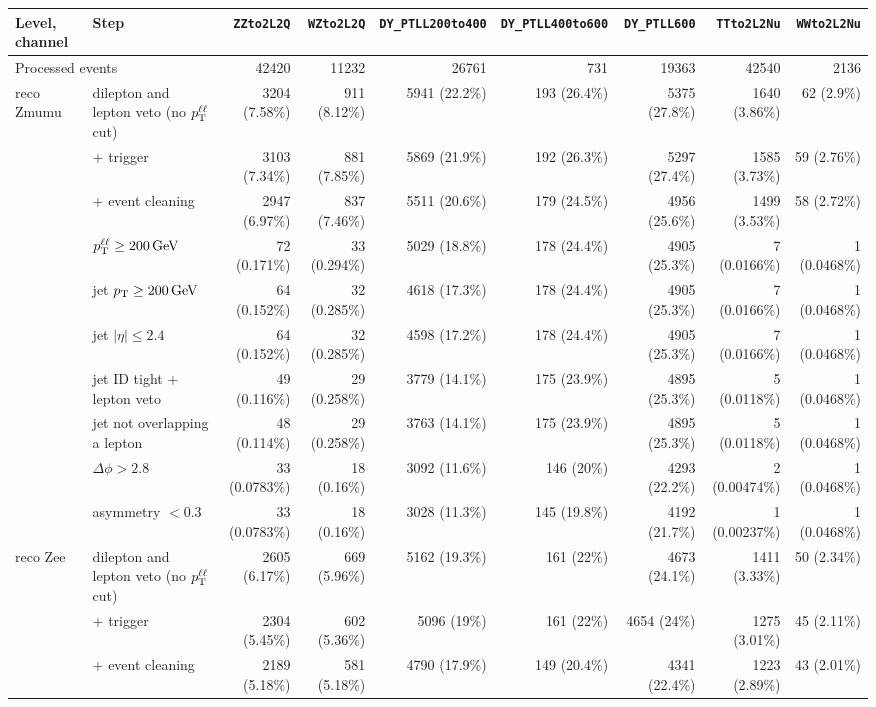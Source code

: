 \begin{tabular}{llrrrrrrr}
\toprule
Level, channel & Step & \texttt{ZZto2L2Q} & \texttt{WZto2L2Q} & \texttt{DY\_PTLL200to400} & \texttt{DY\_PTLL400to600} & \texttt{DY\_PTLL600} & \texttt{TTto2L2Nu} & \texttt{WWto2L2Nu} \\
\midrule
\multicolumn{2}{l}{Processed events} & 42420 & 11232 & 26761 & 731 & 19363 & 42540 & 2136 \\
\midrule
reco Zmumu & dilepton and lepton veto (no $p_{\mathrm{T}}^{\ell\ell}$ cut) & 3204 (7.58\%) & 911 (8.12\%) & 5941 (22.2\%) & 193 (26.4\%) & 5375 (27.8\%) & 1640 (3.86\%) & 62 (2.9\%) \\
 & + trigger & 3103 (7.34\%) & 881 (7.85\%) & 5869 (21.9\%) & 192 (26.3\%) & 5297 (27.4\%) & 1585 (3.73\%) & 59 (2.76\%) \\
 & + event cleaning & 2947 (6.97\%) & 837 (7.46\%) & 5511 (20.6\%) & 179 (24.5\%) & 4956 (25.6\%) & 1499 (3.53\%) & 58 (2.72\%) \\
 & $p_{\mathrm{T}}^{\ell\ell} \geq 200\,\mathrm{GeV}$ & 72 (0.171\%) & 33 (0.294\%) & 5029 (18.8\%) & 178 (24.4\%) & 4905 (25.3\%) & 7 (0.0166\%) & 1 (0.0468\%) \\
 & jet $p_{\mathrm{T}} \geq 200\,\mathrm{GeV}$ & 64 (0.152\%) & 32 (0.285\%) & 4618 (17.3\%) & 178 (24.4\%) & 4905 (25.3\%) & 7 (0.0166\%) & 1 (0.0468\%) \\
 & jet $|\eta| \leq 2.4$ & 64 (0.152\%) & 32 (0.285\%) & 4598 (17.2\%) & 178 (24.4\%) & 4905 (25.3\%) & 7 (0.0166\%) & 1 (0.0468\%) \\
 & jet ID tight + lepton veto & 49 (0.116\%) & 29 (0.258\%) & 3779 (14.1\%) & 175 (23.9\%) & 4895 (25.3\%) & 5 (0.0118\%) & 1 (0.0468\%) \\
 & jet not overlapping a lepton & 48 (0.114\%) & 29 (0.258\%) & 3763 (14.1\%) & 175 (23.9\%) & 4895 (25.3\%) & 5 (0.0118\%) & 1 (0.0468\%) \\
 & $\Delta\phi > 2.8$ & 33 (0.0783\%) & 18 (0.16\%) & 3092 (11.6\%) & 146 (20\%) & 4293 (22.2\%) & 2 (0.00474\%) & 1 (0.0468\%) \\
 & asymmetry $< 0.3$ & 33 (0.0783\%) & 18 (0.16\%) & 3028 (11.3\%) & 145 (19.8\%) & 4192 (21.7\%) & 1 (0.00237\%) & 1 (0.0468\%) \\
\midrule
reco Zee & dilepton and lepton veto (no $p_{\mathrm{T}}^{\ell\ell}$ cut) & 2605 (6.17\%) & 669 (5.96\%) & 5162 (19.3\%) & 161 (22\%) & 4673 (24.1\%) & 1411 (3.33\%) & 50 (2.34\%) \\
 & + trigger & 2304 (5.45\%) & 602 (5.36\%) & 5096 (19\%) & 161 (22\%) & 4654 (24\%) & 1275 (3.01\%) & 45 (2.11\%) \\
 & + event cleaning & 2189 (5.18\%) & 581 (5.18\%) & 4790 (17.9\%) & 149 (20.4\%) & 4341 (22.4\%) & 1223 (2.89\%) & 43 (2.01\%) \\

\end{tabular}

